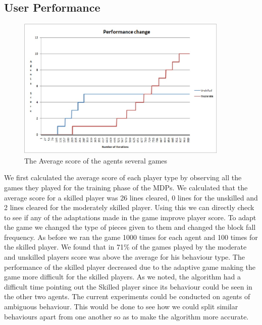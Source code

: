 \documentclass[11pt]{article}
\begin{document}
\subsection{      User Performance}
\FloatBarrier
\begin{figure}[!h]
	\centering
	\includegraphics[width=0.9\textwidth]{s.jpg}
	\caption{The Average score of the agents several games}
	\label{Figure 5}
\end{figure}
\FloatBarrier
We first calculated the average score of each player type by observing all the games they played for the training phase of the MDPs. We calculated that the average score for a skilled player was 26 lines cleared, 0 lines for the unskilled and 2 lines cleared for the moderately skilled player. Using this we can directly check to see if any of the adaptations made in the game improve player score. To adapt the game we changed the type of pieces given to them and changed the block fall frequency. As before we ran the game 1000 times for each agent and 100 times for the skilled player. We found that in 71\% of the games played by the moderate and unskilled players score was above the average for his behaviour type. The performance of the skilled player decreased due to the adaptive game making the game more difficult for the skilled players. As we noted, the algorithm had a difficult time pointing out the Skilled player since its behaviour could be seen in the other two agents. The current experiments could be conducted on agents of ambiguous behaviour. This would be done to see how we could split similar behaviours apart from one another so as to make the algorithm more accurate.
\clearpage
\end{document}
